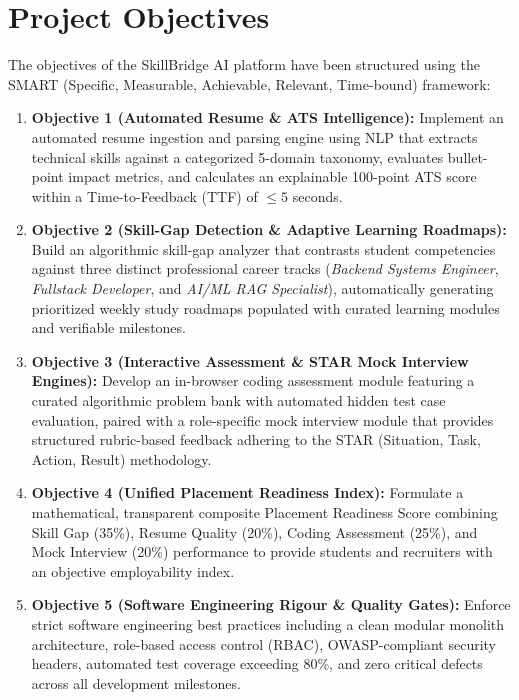 \documentclass[12pt,a4paper,oneside]{report}
\begin{document}
\section{Project Objectives}
The objectives of the SkillBridge AI platform have been structured using the SMART (Specific, Measurable, Achievable, Relevant, Time-bound) framework:
\begin{enumerate}[leftmargin=0.8cm]
    \item \textbf{Objective 1 (Automated Resume \& ATS Intelligence):} Implement an automated resume ingestion and parsing engine using NLP that extracts technical skills against a categorized 5-domain taxonomy, evaluates bullet-point impact metrics, and calculates an explainable 100-point ATS score within a Time-to-Feedback (TTF) of $\le 5$ seconds.
    \item \textbf{Objective 2 (Skill-Gap Detection \& Adaptive Learning Roadmaps):} Build an algorithmic skill-gap analyzer that contrasts student competencies against three distinct professional career tracks (\textit{Backend Systems Engineer}, \textit{Fullstack Developer}, and \textit{AI/ML RAG Specialist}), automatically generating prioritized weekly study roadmaps populated with curated learning modules and verifiable milestones.
    \item \textbf{Objective 3 (Interactive Assessment \& STAR Mock Interview Engines):} Develop an in-browser coding assessment module featuring a curated algorithmic problem bank with automated hidden test case evaluation, paired with a role-specific mock interview module that provides structured rubric-based feedback adhering to the STAR (Situation, Task, Action, Result) methodology.
    \item \textbf{Objective 4 (Unified Placement Readiness Index):} Formulate a mathematical, transparent composite Placement Readiness Score combining Skill Gap (35\%), Resume Quality (20\%), Coding Assessment (25\%), and Mock Interview (20\%) performance to provide students and recruiters with an objective employability index.
    \item \textbf{Objective 5 (Software Engineering Rigour \& Quality Gates):} Enforce strict software engineering best practices including a clean modular monolith architecture, role-based access control (RBAC), OWASP-compliant security headers, automated test coverage exceeding 80\%, and zero critical defects across all development milestones.
\end{enumerate}

\newpage
\thispagestyle{empty}
\hbox{}
\thispagestyle{empty}
\newpage
\end{document}
